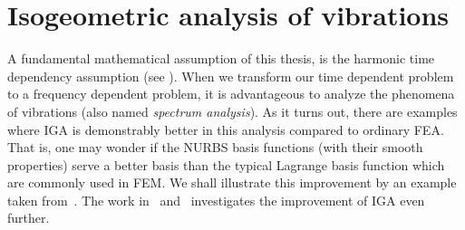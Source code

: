 \section{Isogeometric analysis of vibrations}
\label{Sec2:vibrations}
A fundamental mathematical assumption of this thesis, is the harmonic time dependency assumption (see ). When we transform our time dependent problem to a frequency dependent problem, it is advantageous to analyze the phenomena of vibrations (also named \textit{spectrum analysis}). As it turns out, there are examples where IGA is demonstrably better in this analysis compared to ordinary FEA. That is, one may wonder if the NURBS basis functions (with their smooth properties) serve a better basis than the typical Lagrange basis function which are commonly used in FEM. We shall illustrate this improvement by an example taken from~\cite{Cottrell2009iat}. The work in~\cite{hughes2009imi} and~\cite{Cottrell2006iao} investigates the improvement of IGA even further.


